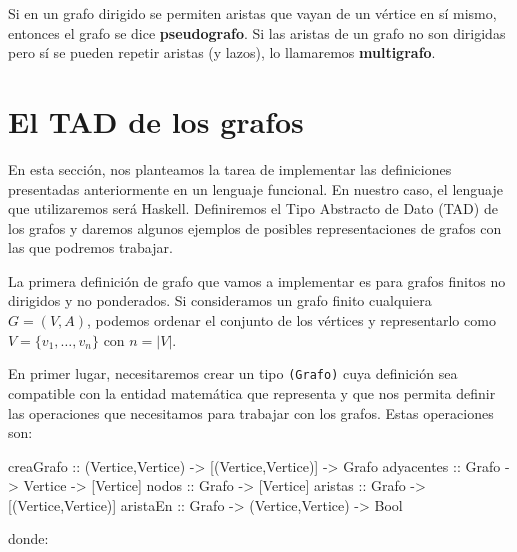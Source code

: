 \begin{ejemplo}
\begin{center}
  \end{center}
\end{ejemplo}

\begin{definicion} 
  Si en un grafo dirigido se permiten aristas que vayan de un vértice en sí mismo, 
  entonces el grafo se dice \textbf{pseudografo}. Si las aristas de un grafo no son dirigidas
  pero sí se pueden repetir aristas (y lazos), lo llamaremos \textbf{multigrafo}.
\end{definicion}

\section{El TAD de los grafos}

\label{sec:TAD_grafos}

En esta sección, nos planteamos la tarea de implementar las
definiciones presentadas anteriormente en un lenguaje funcional. En nuestro
caso, el lenguaje que utilizaremos será Haskell. Definiremos el Tipo Abstracto
de Dato (TAD) de los grafos y daremos algunos ejemplos de posibles
representaciones de grafos con las que podremos trabajar.

La primera definición de grafo que vamos a implementar es para grafos finitos no
dirigidos y no ponderados. Si consideramos un grafo finito cualquiera 
$G = (V,A)$, podemos ordenar el conjunto de los vértices y representarlo como 
$V = \{v_1, \dots, v_n\}$ con $n = |V|$.

En primer lugar, necesitaremos crear un tipo \texttt{(Grafo)} cuya definición sea compatible
con la entidad matemática que representa y que nos permita definir las operaciones que 
necesitamos para trabajar con los grafos. Estas operaciones son:

\begin{code}
creaGrafo   :: (Vertice,Vertice) -> [(Vertice,Vertice)] -> Grafo
adyacentes  :: Grafo -> Vertice -> [Vertice]
nodos       :: Grafo -> [Vertice]
aristas     :: Grafo -> [(Vertice,Vertice)]
aristaEn    :: Grafo -> (Vertice,Vertice) -> Bool
\end{code}
donde:

